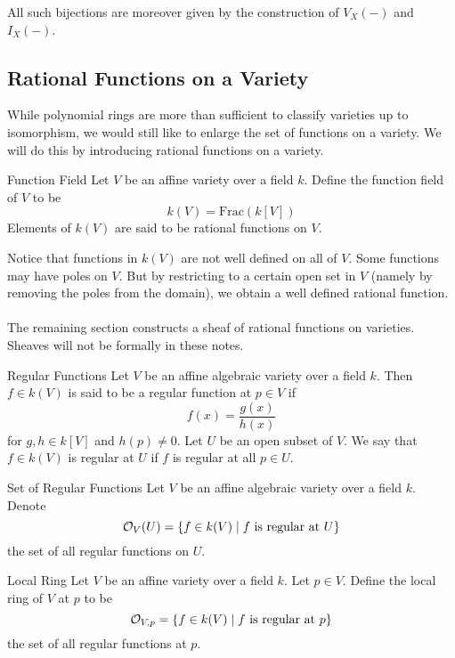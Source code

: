 \documentclass[a4paper]{article}
\begin{document}
All such bijections are moreover given by the construction of $V_X(-)$ and $I_X(-)$. 

\subsection{Rational Functions on a Variety}
While polynomial rings are more than sufficient to classify varieties up to isomorphism, we would still like to enlarge the set of functions on a variety. We will do this by introducing rational functions on a variety. 

\begin{defn}{Function Field}{} Let $V$ be an affine variety over a field $k$. Define the function field of $V$ to be $$k(V)=\text{Frac}(k[V])$$ Elements of $k(V)$ are said to be rational functions on $V$. 
\end{defn}

Notice that functions in $k(V)$ are not well defined on all of $V$. Some functions may have poles on $V$. But by restricting to a certain open set in $V$ (namely by removing the poles from the domain), we obtain a well defined rational function. \\~\\

The remaining section constructs a sheaf of rational functions on varieties. Sheaves will not be formally in these notes. 

\begin{defn}{Regular Functions}{} Let $V$ be an affine algebraic variety over a field $k$. Then $f\in k(V)$ is said to be a regular function at $p\in V$ if $$f(x)=\frac{g(x)}{h(x)}$$ for $g,h\in k[V]$ and $h(p)\neq 0$. Let $U$ be an open subset of $V$. We say that $f\in k(V)$ is regular at $U$ if $f$ is regular at all $p\in U$. 
\end{defn}

\begin{defn}{Set of Regular Functions}{} Let $V$ be an affine algebraic variety over a field $k$. Denote $$\mathcal{O}_V(U)=\{f\in k(V)\;|\;f\text{ is regular at }U\}$$ the set of all regular functions on $U$. 
\end{defn}

\begin{defn}{Local Ring}{} Let $V$ be an affine variety over a field $k$. Let $p\in V$. Define the local ring of $V$ at $p$ to be $$\mathcal{O}_{V,p}=\{f\in k(V)\;|\;f\text{ is regular at }p\}$$ the set of all regular functions at $p$. 
\end{defn}
\end{document}
